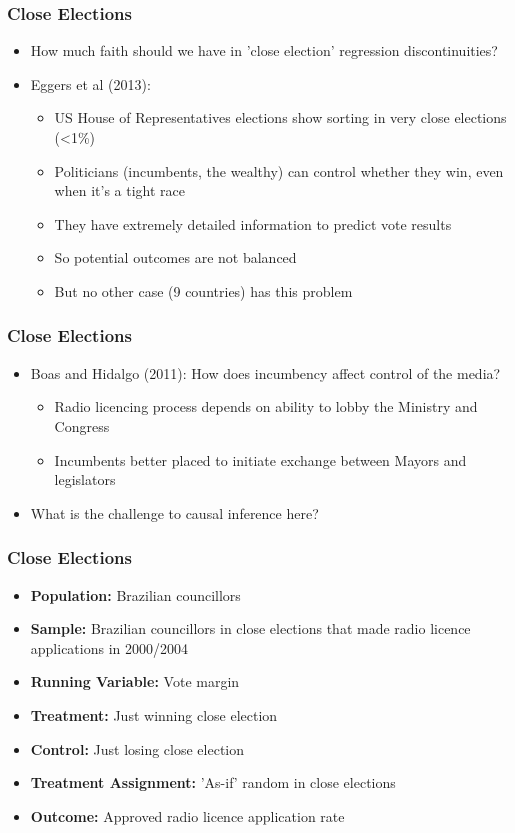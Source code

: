 \documentclass[xcolor=x11names,compress]{beamer}\usepackage[]{graphicx}\usepackage[]{color}
\renewcommand{\(}{\begin{columns}}
\renewcommand{\)}{\end{columns}}
\newcommand{\<}[1]{\begin{column}{#1}}
\renewcommand{\>}{\end{column}}
\begin{document}
\begin{frame}
\frametitle{Close Elections}
\begin{itemize}
\item How much faith should we have in 'close election' regression discontinuities?
\pause
\item Eggers et al (2013):
\pause
\begin{itemize}
\item US House of Representatives elections show sorting in very close elections (<1\%)
\pause
\item Politicians (incumbents, the wealthy) can control whether they win, even when it's a tight race
\pause
\item They have extremely detailed information to predict vote results
\pause
\item So potential outcomes are not balanced
\pause
\item But no other case (9 countries) has this problem
\end{itemize}
\end{itemize}
\end{frame}

\begin{frame}
\frametitle{Close Elections}
\begin{itemize}
\item Boas and Hidalgo (2011): How does incumbency affect control of the media?
\pause
\begin{itemize}
\item Radio licencing process depends on ability to lobby the Ministry and Congress
\pause
\item Incumbents better placed to initiate exchange between Mayors and legislators
\pause
\end{itemize}
\item What is the challenge to causal inference here?
\end{itemize}
\end{frame}

\begin{frame}
\frametitle{Close Elections}
\begin{itemize}
\item \textbf{Population:} Brazilian councillors
\item \textbf{Sample:} Brazilian councillors in close elections that made radio licence applications in 2000/2004
\item \textbf{Running Variable:} Vote margin
\item \textbf{Treatment:} Just winning close election
\item \textbf{Control:} Just losing close election
\item \textbf{Treatment Assignment:} 'As-if' random in close elections
\item \textbf{Outcome:} Approved radio licence application rate
\end{itemize}
\end{frame}
\end{document}
